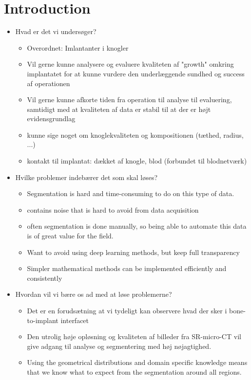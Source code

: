 
\section{Introduction}

\begin{itemize}
 \item Hvad er det vi undersøger?
     \begin{itemize}
     	\item Overordnet: Imlantanter i knogler
     	\item Vil gerne kunne analysere og evaluere kvaliteten af "growth" omkring implantatet for at kunne vurdere den underlæggende sundhed og success af operationen
     	\item Vil gerne kunne afkorte tiden fra operation til analyse til evaluering, samtidigt med at kvaliteten af data er stabil til at der er højt evidensgrundlag
     	\item kunne sige noget om knoglekvaliteten og kompositionen (tæthed, radius, ...)
     	\item kontakt til implantat: dækket af knogle, blod (forbundet til blodnetværk)
     \end{itemize}
 \item Hvilke problemer indebærer det som skal løses?
     \begin{itemize}
     	\item Segmentation is hard and time-consuming to do on this type of data.
     	\item contains noise that is hard to avoid from data acquisition
     	\item often segmentation is done manually, so being able to automate this data is of great value for the field.
     	\item Want to avoid using deep learning methods, but keep full transparency 
     	\item Simpler mathematical methods can be implemented efficiently and consistently
     \end{itemize}
 \item Hvordan vil vi bære os ad med at løse problemerne?
     \begin{itemize}
     	\item Det er en forudsætning at vi tydeligt kan observere hvad der sker i bone-to-implant interfacet
     	\item Den utrolig høje opløsning og kvaliteten af billeder fra SR-micro-CT vil give adgang til analyse og segmentering med høj nøjagtighed.
     	\item Using the geometrical distributions and domain specific knowledge means that we know what to expect from the segmentation around all regions.
     \end{itemize}
\end{itemize}
